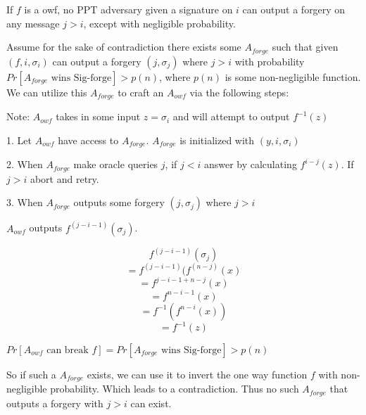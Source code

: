 \documentclass[12pt]{article}
\newenvironment{question}[2][Question]{\begin{trivlist}
		\item[\hskip \labelsep {\bfseries #1}\hskip \labelsep {\bfseries #2.}]}{\end{trivlist}}
\begin{document}
		
	\begin{question}{6}
		If $f$ is a owf, no PPT adversary given a signature on $i$ can output a forgery on any message $j > i$, except with negligible probability. 
		
		Assume for the sake of contradiction there exists some $A_{forge}$ such that given $(f, i, \sigma_i)$ can output a forgery $(j, \sigma_j)$ where $j>i$ with probability $Pr[A_{forge} \text{ wins Sig-forge}] > p(n)$, where $p(n)$ is some non-negligible function. We can utilize this $A_{forge}$ to craft an $A_{owf}$ via the following steps:
		
		Note: $A_{owf}$ takes in some input $z = \sigma_i$ and will attempt to output $f^{-1}(z)$
		
		1. Let $A_{owf}$ have access to $A_{forge}$. $A_{forge}$ is initialized with $(y, i, \sigma_i)$
				
		2. When $A_{forge}$ make oracle queries $j$, if $j<i$ answer by calculating $f^{i-j}(z)$. If $j>i$ abort and retry.
		
		3. When $A_{forge}$ outputs some forgery $(j, \sigma_j)$ where $j>i$ 	
		
		$A_{owf}$ outputs $f^{(j-i-1)}(\sigma_j)$.
		
		$$f^{(j-i-1)}(\sigma_j)$$ 
		$$= f^{(j-i-1)}(f^{(n-j)}(x)$$
		$$=f^{j-i-1+n-j}(x)$$
		$$=f^{n-i-1}(x)$$
		$$=f^{-1}(f^{n-i}(x))$$
		$$= f^{-1}(z)$$
		
		$Pr[A_{owf} \text{ can break } f]= Pr[A_{forge} \text{ wins Sig-forge}] > p(n)$
		
		
		So if such a $A_{forge}$ exists, we can  use it to invert the one way function $f$ with non-negligible probability. 
		Which leads to a contradiction. Thus no such $A_{forge}$ that outputs a forgery with $j>i$ can exist.
		
	\end{question}
		
		
	
	
\end{document}
